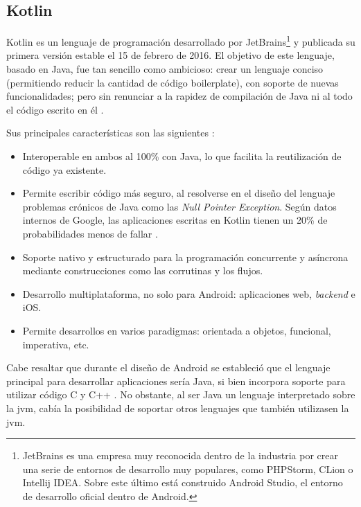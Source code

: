     \subsection{Kotlin}

        Kotlin es un lenguaje de programación desarrollado por JetBrains\footnote{JetBrains es una empresa muy reconocida dentro de la industria por crear una serie de entornos de desarrollo muy populares, como PHPStorm, CLion o Intellij IDEA. Sobre este último está construido Android Studio, el entorno de desarrollo oficial dentro de Android.} y publicada su primera versión estable el 15 de febrero de 2016. El objetivo de este lenguaje, basado en Java, fue tan sencillo como ambicioso: crear un lenguaje conciso (permitiendo reducir la cantidad de código \gls{boilerplate}), con soporte de nuevas funcionalidades; pero sin renunciar a la rapidez de compilación de Java ni al todo el código escrito en él \cite{rao_k_history_nodate}. 

        Sus principales características son las siguientes \cite{kotlin_help_kotlin_nodate} \cite{android_developers_enfoque_nodate}:
        \begin{itemize}
            \item Interoperable en ambos al 100\% con Java, lo que facilita la reutilización de código ya existente.
            \item Permite escribir código más seguro, al resolverse en el diseño del lenguaje problemas crónicos de Java como las \textit{Null Pointer Exception}. Según datos internos de Google, las aplicaciones escritas en Kotlin tienen un 20\% de probabilidades menos de fallar \cite{android_developers_enfoque_nodate}.
            \item Soporte nativo y estructurado para la programación concurrente y asíncrona mediante construcciones como las corrutinas y los flujos.
            \item Desarrollo multiplataforma, no solo para Android: aplicaciones web, \textit{backend} e iOS.
            \item Permite desarrollos en varios paradigmas: orientada a objetos, funcional, imperativa, etc.
        \end{itemize}

        Cabe resaltar que durante el diseño de Android se estableció que el lenguaje principal para desarrollar aplicaciones sería Java, si bien incorpora soporte para utilizar código C y C++ \cite{android_developers_como_nodate}. No
        obstante, al ser Java un lenguaje interpretado sobre la \gls{jvm}, cabía la posibilidad de soportar otros lenguajes que también utilizasen la \gls{jvm}.
        
